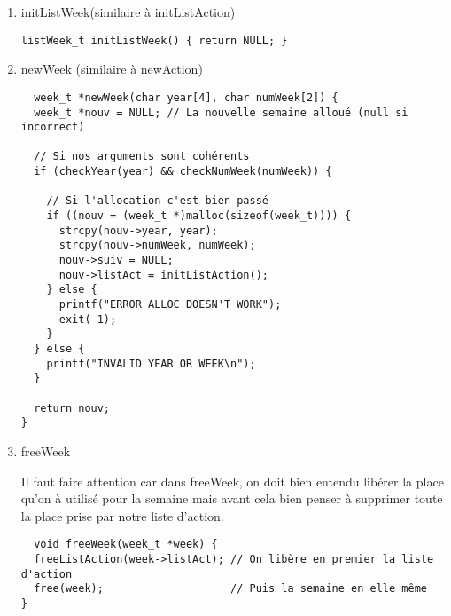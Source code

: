 \documentclass[11pt]{article}
\begin{document}
\begin{enumerate}
\item initListWeek(similaire à initListAction)
\label{sec:org019690d}

\begin{lstlisting}
listWeek_t initListWeek() { return NULL; }
\end{lstlisting}


\item newWeek (similaire à newAction)
\label{sec:orgbcc1b28}

\begin{lstlisting}
  week_t *newWeek(char year[4], char numWeek[2]) {
  week_t *nouv = NULL; // La nouvelle semaine alloué (null si incorrect)

  // Si nos arguments sont cohérents
  if (checkYear(year) && checkNumWeek(numWeek)) {

    // Si l'allocation c'est bien passé
    if ((nouv = (week_t *)malloc(sizeof(week_t)))) {
      strcpy(nouv->year, year);
      strcpy(nouv->numWeek, numWeek);
      nouv->suiv = NULL;
      nouv->listAct = initListAction();
    } else {
      printf("ERROR ALLOC DOESN'T WORK");
      exit(-1);
    }
  } else {
    printf("INVALID YEAR OR WEEK\n");
  }

  return nouv;
}
\end{lstlisting}


\item freeWeek
\label{sec:org3aa7c1c}

Il faut faire attention car dans freeWeek, on doit bien entendu libérer la
place qu'on à utilisé pour la semaine mais avant cela bien penser à
supprimer toute la place prise par notre liste d'action.

\begin{lstlisting}
  void freeWeek(week_t *week) {
  freeListAction(week->listAct); // On libère en premier la liste d'action
  free(week);                    // Puis la semaine en elle même
}


\end{lstlisting}
\end{enumerate}
\end{document}
